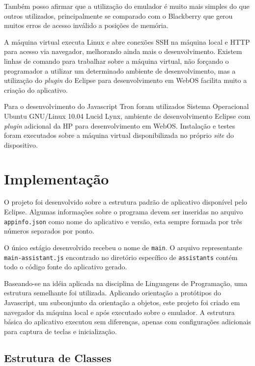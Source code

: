 \documentclass{article}
\begin{document}
Também posso afirmar que a utilização do emulador é muito mais simples do que
outros utilizados, principalmente se comparado com o Blackberry que gerou muitos
erros de acesso inválido a posições de memória.

A máquina virtual executa Linux e abre conexões SSH na máquina local e HTTP para
acesso via navegador, melhorando ainda mais o desenvolvimento. Existem linhas de
comando para trabalhar sobre a máquina virtual, não forçando o programador a
utilizar um determinado ambiente de desenvolvimento, mas a utilização do
\emph{plugin} do Eclipse para desenvolvimento em WebOS facilita muito a criação
do aplicativo.

Para o desenvolvimento do Javascript Tron foram utilizados Sistema Operacional
Ubuntu GNU/Linux 10.04 Lucid Lynx, ambiente de desenvolvimento Eclipse com
\emph{plugin} adicional da HP para desenvolvimento em WebOS. Instalação e testes
foram executados sobre a máquina virtual disponibilizada no próprio \emph{site}
do dispositivo.

\section{Implementação}
\label{sec:implementacao}

O projeto foi desenvolvido sobre a estrutura padrão de aplicativo disponível
pelo Eclipse. Algumas informações sobre o programa devem ser inseridas no
arquivo \texttt{appinfo.json} como nome do aplicativo e versão, esta sempre
formada por três números separados por ponto.

O único estágio desenvolvido recebeu o nome de \texttt{main}. O arquivo
representante \texttt{main-assistant.js} encontrado no diretório específico de
\texttt{assistants} contém todo o código fonte do aplicativo gerado.

Baseando-se na idéia aplicada na disciplina de Linguagens de Programação, uma
estrutura semelhante foi utilizada. Aplicando orientação a protótipos do
Javascript, um subconjunto da orientação a objetos, este projeto foi criado em
navegador da máquina local e após executado sobre o emulador. A estrutura básica
do aplicativo executou sem diferenças, apenas com configurações adicionais para
captura de teclas e inicialização.

\subsection{Estrutura de Classes}
\end{document}
